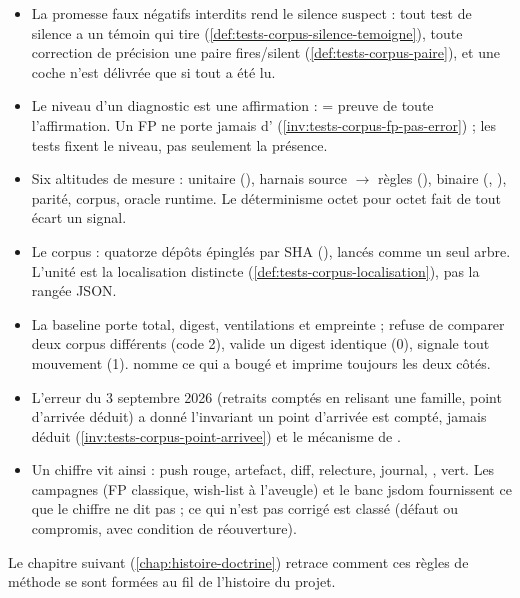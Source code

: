 \begin{resume}
\begin{itemize}
  \item La promesse \og faux négatifs interdits\fg{} rend le silence suspect : tout test de silence a un témoin qui tire (\cref{def:tests-corpus-silence-temoigne}), toute correction de précision une paire fires/silent (\cref{def:tests-corpus-paire}), et une coche n'est délivrée que si tout a été lu.
  \item Le niveau d'un diagnostic est une affirmation : \Error{} = preuve de toute l'affirmation. Un FP ne porte jamais d'\Error{} (\cref{inv:tests-corpus-fp-pas-error}) ; les tests fixent le niveau, pas seulement la présence.
  \item Six altitudes de mesure : unitaire (), harnais source $\to$ règles (), binaire (, ), parité, corpus, oracle runtime. Le déterminisme octet pour octet fait de tout écart un signal.
  \item Le corpus : quatorze dépôts épinglés par SHA (), lancés comme un seul arbre. L'unité est la localisation distincte  (\cref{def:tests-corpus-localisation}), pas la rangée JSON.
  \item La baseline  porte total, digest, ventilations et empreinte ;  refuse de comparer deux corpus différents (code 2), valide un digest identique (0), signale tout mouvement (1).  nomme ce qui a bougé et imprime toujours les deux côtés.
  \item L'erreur du 3 septembre 2026 (retraits comptés en relisant une famille, point d'arrivée déduit) a donné l'invariant \og un point d'arrivée est compté, jamais déduit\fg{} (\cref{inv:tests-corpus-point-arrivee}) et le mécanisme de .
  \item Un chiffre vit ainsi : push rouge, artefact, diff, relecture, journal, , vert. Les campagnes (FP classique, wish-list à l'aveugle) et le banc jsdom fournissent ce que le chiffre ne dit pas ; ce qui n'est pas corrigé est classé (défaut ou compromis,  avec condition de réouverture).
\end{itemize}
Le chapitre suivant (\cref{chap:histoire-doctrine}) retrace comment ces règles de méthode se sont formées au fil de l'histoire du projet.
\end{resume}

